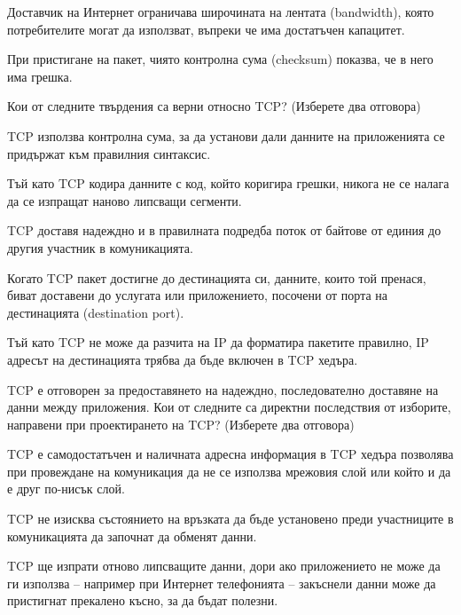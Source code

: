 \begin{questions}
\begin{choices}
    \CorrectChoice Доставчик на Интернет ограничава широчината на лентата
    (\foreignlanguage{english}{bandwidth}), която потребителите могат да
    използват, въпреки че има достатъчен капацитет.

    \choice При пристигане на пакет, чиято контролна сума
    (\foreignlanguage{english}{checksum}) показва, че в него има грешка.
  \end{choices}

  \question[6] Кои от следните твърдения са верни относно
  \foreignlanguage{english}{TCP}? (Изберете два отговора)
  \begin{choices}
    \choice \foreignlanguage{english}{TCP} използва контролна сума, за да
    установи дали данните на приложенията се придържат към правилния синтаксис.

    \choice Тъй като \foreignlanguage{english}{TCP} кодира данните с код, който
    коригира грешки, никога не се налага да се изпращат наново липсващи
    сегменти.

    \CorrectChoice \foreignlanguage{english}{TCP} доставя надеждно и в
    правилната подредба поток от байтове от единия до другия участник в
    комуникацията.

    \CorrectChoice Когато \foreignlanguage{english}{TCP} пакет достигне до
    дестинацията си, данните, които той пренася, биват доставени до услугата или
    приложението, посочени от порта на дестинацията
    (\foreignlanguage{english}{destination port}).

    \choice Тъй като \foreignlanguage{english}{TCP} не може да разчита на
    IP да форматира пакетите правилно, IP адресът на дестинацията трябва да бъде
    включен в TCP хедъра.
  \end{choices}

  \question[6] TCP е отговорен за предоставянето на надеждно, последователно
  доставяне на данни между приложения. Кои от следните са директни последствия
  от изборите, направени при проектирането на TCP? (Изберете два отговора)
  \begin{choices}
    \choice TCP е самодостатъчен и наличната адресна информация в TCP хедъра
    позволява при провеждане на комуникация да не се използва мрежовия слой или
    който и да е друг по-нисък слой.

    \choice TCP не изисква състоянието на връзката да бъде установено преди
    участниците в комуникацията да започнат да обменят данни.

    \CorrectChoice TCP ще изпрати отново липсващите данни, дори ако приложението
    не може да ги използва -- например при Интернет телефонията -- закъснели
    данни може да пристигнат прекалено късно, за да бъдат полезни.


\end{choices}
\end{questions}
